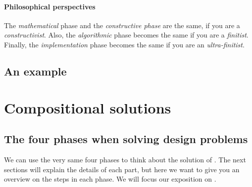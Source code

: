 \paragraph*{Philosophical perspectives}
The \emph{mathematical} phase and the \emph{constructive phase} are the same, if you are a \emph{constructivist}.
Also, the \emph{algorithmic} phase becomes the same if you are a \emph{finitist}.
Finally, the \emph{implementation} phase becomes the same if you are an \emph{ultra-finitist}.

\devel{
    
}

\devel{
    

    
}

\subsection{An example}


\section{Compositional solutions}


\subsection{The four phases when solving  design problems}
We can use the very same four phases to think about the solution of .
The next sections will explain the details of each part, but here we want to give you an overview on the steps in each phase.
We will focus our exposition on \FixFunMinRes.

